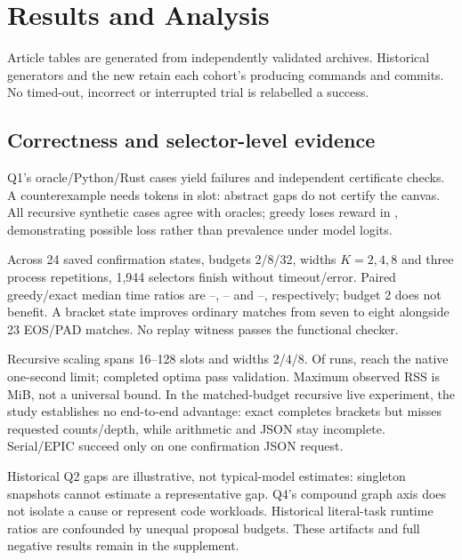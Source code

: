 \section{Results and Analysis}
\label{sec:resultados}

Article tables are generated from independently validated archives. Historical generators and the new  retain each cohort's producing commands and commits. No timed-out, incorrect or interrupted trial is relabelled a success.

\subsection{Correctness and selector-level evidence}

Q1's \MThirteenQOneCases{} oracle/Python/Rust cases yield \MThirteenQOneFailures{} failures and \MThirteenQOneCertificateChecks{} independent certificate checks. A counterexample needs \MThirteenQThreeRequiredTokens{} tokens in \MThirteenQThreeAvailableSlots{} slot: abstract gaps do not certify the canvas. All \MReviewBranchingCases{} recursive synthetic cases agree with oracles; greedy loses reward in \MReviewBranchingGaps{}, demonstrating possible loss rather than prevalence under model logits.

Across 24 saved confirmation states, budgets 2/8/32, widths $K=2,4,8$ and three process repetitions, 1,944 selectors finish without timeout/error. Paired greedy/exact median time ratios are \MAuditTwoMin{}--\MAuditTwoMax{}, \MAuditEightMin{}--\MAuditEightMax{} and \MAuditAllMin{}--\MAuditAllMax{}, respectively; budget 2 does not benefit. A bracket state improves ordinary matches from seven to eight alongside 23 EOS/PAD matches. No replay witness passes the functional checker.

Recursive scaling spans 16--128 slots and widths 2/4/8. Of \MReviewScalingCases{} runs, \MReviewScalingTimeouts{} reach the native one-second limit; completed optima pass validation. Maximum observed RSS is \MReviewScalingMaxMiB{} MiB, not a universal bound. In the matched-budget recursive live experiment, the study establishes no end-to-end advantage: exact completes brackets but misses requested counts/depth, while arithmetic and JSON stay incomplete. Serial/EPIC succeed only on one confirmation JSON request.

Historical Q2 gaps are illustrative, not typical-model estimates: singleton snapshots cannot estimate a representative gap. Q4's compound graph axis does not isolate a cause or represent code workloads. Historical literal-task runtime ratios are confounded by unequal proposal budgets. These artifacts and full negative results remain in the supplement.


